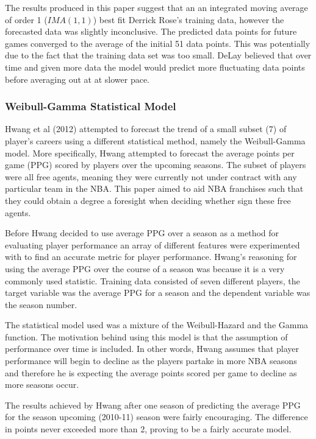 \documentclass[a4paper,11pt,twoside]{article}
\begin{document}
The results produced in this paper suggest that an an integrated moving average of order 1 ($IMA(1,1)$) best fit Derrick Rose's training data, however the forecasted data was slightly inconclusive. The predicted data points for future games converged to the average of the initial 51 data points. This was potentially due to the fact that the training data set was too small. DeLay believed that over time and given more data the model would predict more fluctuating data points before averaging out at at slower pace. 


\subsubsection{Weibull-Gamma Statistical Model}

Hwang et al (2012) attempted to forecast the trend of a small subset (7) of player's careers using a different statistical method, namely the Weibull-Gamma model. More specifically, Hwang attempted to forecast the average points per game (PPG) scored by players over the upcoming seasons. The subset of players were all free agents, meaning they were currently not under contract with any particular team in the NBA. This paper aimed to aid NBA franchises such that they could obtain a degree a foresight when deciding whether sign these free agents.


Before Hwang decided to use average PPG over a season as a method for evaluating player performance an array of different features were experimented with to find an accurate metric for player performance. Hwang's reasoning for using the average PPG over the course of a season was because it is a very commonly used statistic. Training data consisted of seven different players, the target variable was the average PPG for a season and the dependent variable was the season number. 

The statistical model used was a mixture of the Weibull-Hazard and the Gamma function. The motivation behind using this model is that the assumption of performance over time is included. In other words, Hwang assumes that player performance will begin to decline as the players partake in more NBA seasons and therefore he is expecting the average points scored per game to decline as more seasons occur.

The results achieved by Hwang after one season of predicting the average PPG for the season upcoming (2010-11) season were fairly encouraging. The difference in points never exceeded more than 2, proving to be a fairly accurate model.
\end{document}
